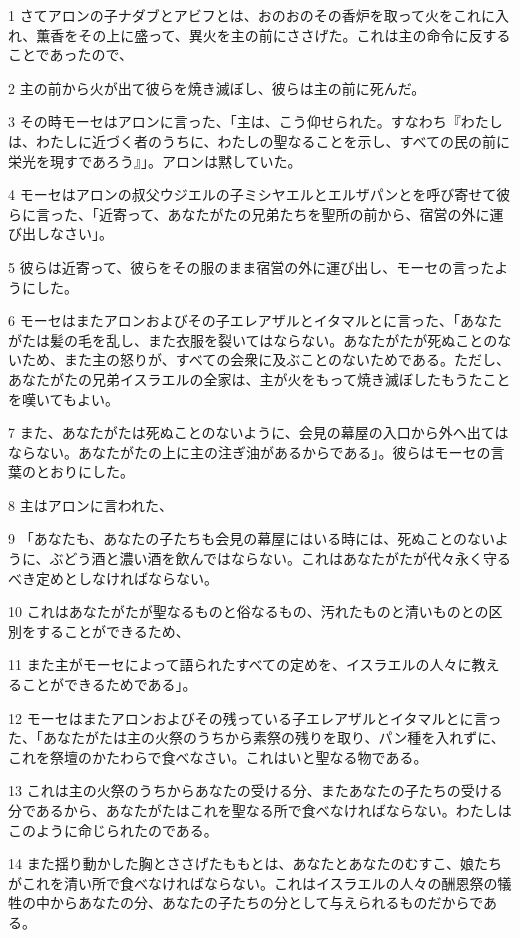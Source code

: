 \par 1 さてアロンの子ナダブとアビフとは、おのおのその香炉を取って火をこれに入れ、薫香をその上に盛って、異火を主の前にささげた。これは主の命令に反することであったので、
\par 2 主の前から火が出て彼らを焼き滅ぼし、彼らは主の前に死んだ。
\par 3 その時モーセはアロンに言った、「主は、こう仰せられた。すなわち『わたしは、わたしに近づく者のうちに、わたしの聖なることを示し、すべての民の前に栄光を現すであろう』」。アロンは黙していた。
\par 4 モーセはアロンの叔父ウジエルの子ミシヤエルとエルザパンとを呼び寄せて彼らに言った、「近寄って、あなたがたの兄弟たちを聖所の前から、宿営の外に運び出しなさい」。
\par 5 彼らは近寄って、彼らをその服のまま宿営の外に運び出し、モーセの言ったようにした。
\par 6 モーセはまたアロンおよびその子エレアザルとイタマルとに言った、「あなたがたは髪の毛を乱し、また衣服を裂いてはならない。あなたがたが死ぬことのないため、また主の怒りが、すべての会衆に及ぶことのないためである。ただし、あなたがたの兄弟イスラエルの全家は、主が火をもって焼き滅ぼしたもうたことを嘆いてもよい。
\par 7 また、あなたがたは死ぬことのないように、会見の幕屋の入口から外へ出てはならない。あなたがたの上に主の注ぎ油があるからである」。彼らはモーセの言葉のとおりにした。
\par 8 主はアロンに言われた、
\par 9 「あなたも、あなたの子たちも会見の幕屋にはいる時には、死ぬことのないように、ぶどう酒と濃い酒を飲んではならない。これはあなたがたが代々永く守るべき定めとしなければならない。
\par 10 これはあなたがたが聖なるものと俗なるもの、汚れたものと清いものとの区別をすることができるため、
\par 11 また主がモーセによって語られたすべての定めを、イスラエルの人々に教えることができるためである」。
\par 12 モーセはまたアロンおよびその残っている子エレアザルとイタマルとに言った、「あなたがたは主の火祭のうちから素祭の残りを取り、パン種を入れずに、これを祭壇のかたわらで食べなさい。これはいと聖なる物である。
\par 13 これは主の火祭のうちからあなたの受ける分、またあなたの子たちの受ける分であるから、あなたがたはこれを聖なる所で食べなければならない。わたしはこのように命じられたのである。
\par 14 また揺り動かした胸とささげたももとは、あなたとあなたのむすこ、娘たちがこれを清い所で食べなければならない。これはイスラエルの人々の酬恩祭の犠牲の中からあなたの分、あなたの子たちの分として与えられるものだからである。
